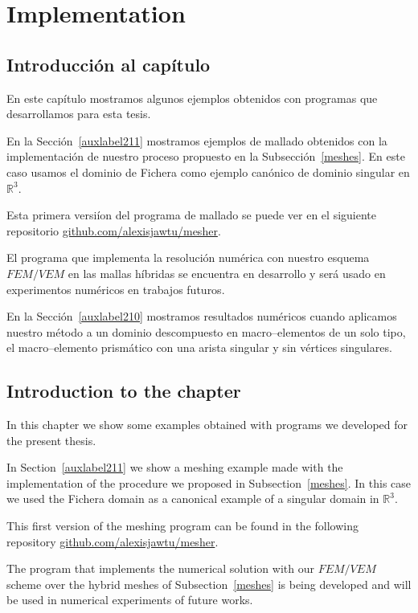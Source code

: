 \chapter{Implementation}

\section*{Introducci\'on al cap\'itulo}
En este cap\'itulo mostramos algunos ejemplos obtenidos 
con programas que desarrollamos para esta tesis.

En la Sección~\ref{auxlabel211} mostramos ejemplos de mallado 
obtenidos con la implementaci\'on de nuestro proceso propuesto 
en la Subsecci\'on~\ref{meshes}. 
En este caso usamos el dominio de Fichera como ejemplo can\'onico 
de dominio singular en $\mathbb{R}^3$.

Esta primera versi\'ion del programa de mallado se puede ver en el siguiente 
repositorio \href{https://github.com/alexisjawtu/mesher}{github.com/alexisjawtu/mesher}.

El programa que implementa la resoluci\'on num\'erica con nuestro esquema
$FEM/VEM$ en las mallas h\'ibridas se encuentra en desarrollo y ser\'a
usado en experimentos num\'ericos en trabajos futuros.

En la Sección~\ref{auxlabel210} mostramos resultados num\'ericos
cuando aplicamos nuestro m\'etodo a un dominio descompuesto en macro--elementos
de un solo tipo, el macro--elemento prism\'atico con una arista singular y sin v\'ertices
singulares.

\section*{Introduction to the chapter}
In this chapter we show some examples obtained with programs we 
developed for the present thesis.

In Section~\ref{auxlabel211} we show a meshing example made with the implementation
of the procedure we proposed in Subsection~\ref{meshes}. In this case we used
the Fichera domain as a canonical example of a singular domain in $\mathbb{R}^3$.

This first version of the meshing program can be found in the following repository
\href{https://github.com/alexisjawtu/mesher}{github.com/alexisjawtu/mesher}.

The program that implements the numerical solution with our $FEM/VEM$ scheme
over the hybrid meshes of Subsection~\ref{meshes} is being developed and will
be used in numerical experiments of future works.

